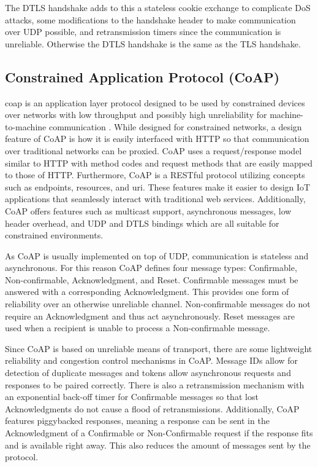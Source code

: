 \documentclass[0-thesis.tex]{subfiles}
\begin{document}
The DTLS handshake adds to this a stateless cookie exchange to complicate DoS attacks,
some modifications to the handshake header to make communication over UDP possible, and
retransmission timers since the communication is unreliable. Otherwise the DTLS handshake
is the same as the TLS handshake.

\subsection{Constrained Application Protocol (CoAP)}
\label{ssec:coap}
\acrfull{coap} is an application layer protocol designed to be used by constrained devices
over networks with low throughput and possibly high unreliability for machine-to-machine
communication \parencite{rfc7252}. While designed for constrained networks, a design
feature of CoAP is how it is easily interfaced with HTTP so that communication over
traditional networks can be proxied. CoAP uses a request/response model similar to HTTP
with method codes and request methods that are easily mapped to those of HTTP.
Furthermore, CoAP is a RESTful protocol utilizing concepts such as endpoints, resources,
and \gls{uri}. These features make it easier to design IoT applications that seamlessly
interact with traditional web services. Additionally, CoAP offers features such as
multicast support, asynchronous messages, low header overhead, and UDP and DTLS bindings
which are all suitable for constrained environments.

As CoAP is usually implemented on top of UDP, communication is stateless and asynchronous.
For this reason CoAP defines four message types: Confirmable, Non-confirmable,
Acknowledgment, and Reset. Confirmable messages must be answered with a corresponding
Acknowledgment. This provides one form of reliability over an otherwise unreliable
channel. Non-confirmable messages do not require an Acknowledgment and thus act
asynchronously. Reset messages are used when a recipient is unable to process a
Non-confirmable message.

Since CoAP is based on unreliable means of transport, there are some lightweight
reliability and congestion control mechanisms in CoAP. Message IDs allow for detection of
duplicate messages and tokens allow asynchronous requests and responses to be paired
correctly. There is also a retransmission mechanism with an exponential back-off timer for
Confirmable messages so that lost Acknowledgments do not cause a flood of retransmissions.
Additionally, CoAP features piggybacked responses, meaning a response can be sent in the
Acknowledgment of a Confirmable or Non-Confirmable request if the response fits and is
available right away. This also reduces the amount of messages sent by the protocol.
\end{document}
